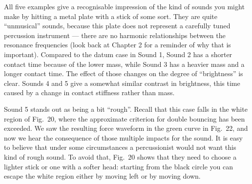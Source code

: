 



  All five examples give a recognisable impression of the kind of sounds you 
  might make by hitting a metal plate with a stick of some sort. They are quite 
  “unmusical” sounds, because this plate does not represent a carefully tuned 
  percussion instrument — there are no harmonic relationships between the 
  resonance frequencies (look back at Chapter 2 for a reminder of why that is 
  important). Compared to the datum case in Sound 1, Sound 2 has a shorter 
  contact time because of the lower mass, while Sound 3 has a heavier mass and 
  a longer contact time. The effect of those changes on the degree of 
  “brightness” is clear. Sounds 4 and 5 give a somewhat similar contrast in 
  brightness, this time caused by a change in contact stiffness rather than 
  mass. 

  Sound 5 stands out as being a bit “rough”. Recall that this case falls in the 
  white region of Fig.\ 20, where the approximate criterion for double bouncing 
  has been exceeded. We saw the resulting force waveform in the green curve in 
  Fig.\ 22, and now we hear the consequence of those multiple impacts for the 
  sound. It is easy to believe that under some circumstances a percussionist 
  would not want this kind of rough sound. To avoid that, Fig.\ 20 shows that 
  they need to choose a lighter stick or one with a softer head: starting from 
  the black circle you can escape the white region either by moving left or by 
  moving down. 

